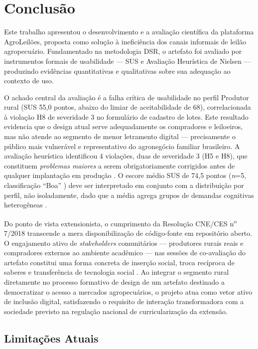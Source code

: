 \documentclass[12pt]{article}
\begin{document}
\section{Conclusão}
\label{sec:conclusao}

Este trabalho apresentou o desenvolvimento e a avaliação científica da plataforma
AgroLeilões, proposta como solução à ineficiência dos canais informais de leilão
agropecuário. Fundamentado na metodologia DSR, o artefato foi avaliado por instrumentos
formais de usabilidade --- SUS e Avaliação Heurística de Nielsen --- produzindo
evidências quantitativas e qualitativas sobre sua adequação ao contexto de uso.

O achado central da avaliação é a falha crítica de usabilidade no perfil Produtor rural
(SUS 55,0 pontos, abaixo do limiar de aceitabilidade de 68), correlacionada à violação
H8 de severidade 3 no formulário de cadastro de lotes. Este resultado evidencia que o
design atual serve adequadamente os compradores e leiloeiros, mas não atende ao segmento
de menor letramento digital --- precisamente o público mais vulnerável e representativo
do agronegócio familiar brasileiro. A avaliação heurística identificou 4 violações, duas
de severidade 3 (H5 e H8), que constituem \textit{problemas maiores} a serem
obrigatoriamente corrigidos antes de qualquer implantação em produção \cite{nielsen1994b}.
O escore médio SUS de 74,5 pontos (\textit{n}=5, classificação ``Boa'' \cite{brooke1996})
deve ser interpretado em conjunto com a distribuição por perfil, não isoladamente, dado
que a média agrega grupos de demandas cognitivas heterogêneas \cite{sauro2011}.

Do ponto de vista extensionista, o cumprimento da Resolução CNE/CES
n\textsuperscript{o} 7/2018 \cite{brasil2018} transcende a mera disponibilização de
código-fonte em repositório aberto. O engajamento ativo de \textit{stakeholders}
comunitários --- produtores rurais reais e compradores externos ao ambiente acadêmico
--- nas sessões de co-avaliação do artefato constitui uma forma concreta de inserção
social, troca recíproca de saberes e transferência de tecnologia social \cite{brasil2018}.
Ao integrar o segmento rural diretamente no processo formativo de design de um artefato
destinado a democratizar o acesso a mercados agropecuários, o projeto atua como vetor
ativo de inclusão digital, satisfazendo o requisito de interação transformadora com a
sociedade previsto na regulação nacional de curricularização da extensão.

\subsection{Limitações Atuais}
\end{document}
